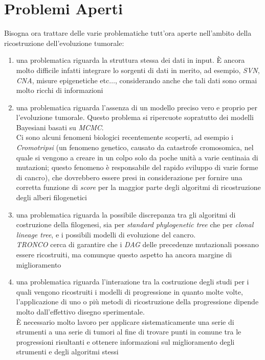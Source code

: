 \documentclass[a4paper,12pt, oneside]{book}
\begin{document}
\section{Problemi Aperti}
Bisogna ora trattare delle varie problematiche tutt'ora aperte nell'ambito della
ricostruzione dell'evoluzione tumorale:
\begin{enumerate}
  \item una problematica riguarda la struttura stessa dei dati in input. È
  ancora molto difficile infatti integrare lo sorgenti di dati in merito, ad
  esempio, \textit{SVN}, \textit{CNA}, misure epigenetiche etc$\ldots$,
  considerando anche che tali dati sono ormai molto ricchi di informazioni
  \item una problematica riguarda l'assenza di un modello preciso vero e proprio
  per l'evoluzione tumorale. Questo problema si ripercuote sopratutto dei
  modelli Bayesiani basati su \textit{MCMC}. \\
  Ci sono alcuni fenomeni biologici recentemente scoperti, ad esempio i
  \textit{Cromotripsi} (un fenomeno genetico, causato da catastrofe cromosomica,
  nel quale si vengono a creare in un colpo solo da poche unità a varie
  centinaia di mutazioni; questo fenomeno è responsabile del rapido sviluppo di
  varie forme di cancro),  
  che dovrebbero essere presi in considerazione per fornire una corretta
  funzione di \textit{score} per la maggior parte degli algoritmi di ricostruzione
  degli alberi filogenetici
  \item una problematica riguarda la possibile discrepanza tra gli algoritmi di
  costruzione della filogenesi, sia per \textit{standard phylogenetic tree} che
  per \textit{clonal lineage tree}, e i possibili modelli di evoluzione del
  cancro.\\
  \textit{TRONCO} cerca di garantire che i \textit{DAG} delle precedenze
  mutazionali possano essere ricostruiti, ma comunque questo aspetto ha ancora
  margine di miglioramento
  \item una problematica riguarda l'interazione tra la costruzione degli studi
  per i quali vengono ricostruiti i modelli di progressione in quanto molte
  volte, l'applicazione di uno o più metodi di ricostruzione della progressione
  dipende molto dall'effettivo disegno sperimentale.\\
  È necessario molto lavoro per applicare sistematicamente una serie di strumenti
  a una serie di tumori al fine di trovare punti in comune tra le
  progressioni risultanti e ottenere informazioni sul miglioramento degli
  strumenti e degli algoritmi stessi 
\end{enumerate}
\end{document}
